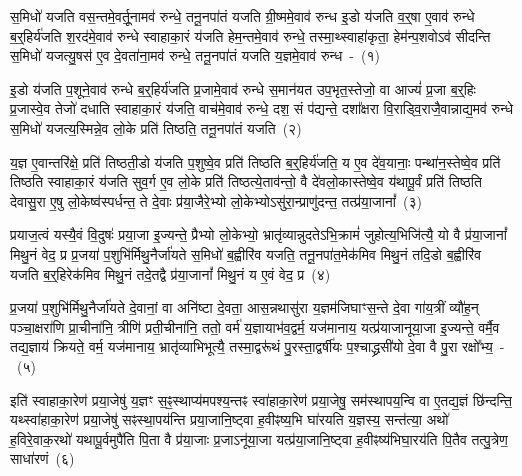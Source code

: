 
\setcounter{anuvakam}{0}
स॒मिधो॑ यजति वस॒न्तमे॒वर्तू॒नामव॑ रुन्धे॒ तनू॒नपा॑तं यजति ग्री॒ष्ममे॒वाव॑ रुन्ध इ॒डो य॑जति व॒र्॒\mbox{}षा ए॒वाव॑ रुन्धे ब॒र्॒\mbox{}हिर्य॑जति श॒रद॑मे॒वाव॑ रुन्धे स्वाहाका॒रं य॑जति हेम॒न्तमे॒वाव॑ रुन्धे॒ तस्मा॒थ्\-स्वाहा॑कृता॒ हेम॑न्प॒शवो\-ऽव॑ सीदन्ति स॒मिधो॑ यजत्यु॒षस॑ ए॒व दे॒वता॑ना॒मव॑ रुन्धे॒ तनू॒नपा॑तं यजति य॒ज्ञमे॒वाव॑ रुन्ध~-~(१)

इ॒डो य॑जति प॒शूने॒वाव॑ रुन्धे ब॒र्॒\mbox{}हिर्य॑जति प्र॒जामे॒वाव॑ रुन्धे स॒मान॑यत उप॒भृत॒स्तेजो॒ वा आज्यं॑ प्र॒जा ब॒र्॒\mbox{}हिः प्र॒जास्वे॒व तेजो॑ दधाति स्वाहाका॒रं य॑जति॒ वाच॑मे॒वाव॑ रुन्धे॒ दश॒ सं प॑द्यन्ते॒ दशा᳚क्षरा वि॒राड्वि॒राजै॒वान्नाद्य॒मव॑ रुन्धे स॒मिधो॑ यजत्य॒स्मिन्ने॒व लो॒के प्रति॑ तिष्ठति॒ तनू॒नपा॑तं यजति~(२)

य॒ज्ञ ए॒वान्तरि॑क्षे॒ प्रति॑ तिष्ठती॒डो य॑जति प॒शुष्वे॒व प्रति॑ तिष्ठति ब॒र्॒\mbox{}हिर्य॑जति॒ य ए॒व दे॑व॒यानाः॒ पन्था॑न॒स्तेष्वे॒व प्रति॑ तिष्ठति स्वाहाका॒रं य॑जति सुव॒र्ग ए॒व लो॒के प्रति॑ तिष्ठत्ये॒ताव॑न्तो॒ वै दे॑व\-लो॒का\-स्तेष्वे॒व य॑थापू॒र्वं प्रति॑ तिष्ठति देवासु॒रा ए॒षु लो॒केष्व॑स्पर्धन्त॒ ते दे॒वाः प्र॑या॒जैरे॒भ्यो लो॒केभ्यो\-ऽसु॑रा॒न्प्राणु॑दन्त॒ तत्प्र॑या॒जानां᳚~(३)

प्रयाज॒त्वं यस्यै॒वं वि॒दुषः॑ प्रया॒जा इ॒ज्यन्ते॒ प्रैभ्यो लो॒केभ्यो॒ भ्रातृ॑व्यान्नुदते\-ऽभि॒क्रामं॑ जुहोत्य॒भिजि॑त्यै॒ यो वै प्र॑या॒जानां᳚ मिथु॒नं वेद॒ प्र प्र॒जया॑ प॒शुभि॑र्मिथु॒नैर्जा॑यते स॒मिधो॑ ब॒ह्वीरि॑व यजति॒ तनू॒नपा॑त॒मेक॑मिव मिथु॒नं तदि॒डो ब॒ह्वीरि॑व यजति ब॒र्॒\mbox{}हिरेक॑मिव मिथु॒नं तदे॒तद्वै प्र॑या॒जानां᳚ मिथु॒नं य ए॒वं वेद॒ प्र~(४)

प्र॒जया॑ प॒शुभि॑र्मिथु॒नैर्जा॑यते दे॒वानां॒ वा अनि॑ष्टा दे॒वता॒ आस॒\-न्नथा\-सु॑रा य॒ज्ञम॑\-जिघाꣳस॒न्ते दे॒वा गा॑य॒त्रीं व्यौ॑ह॒न् पञ्चा॒क्षरा॑णि प्रा॒ची\-ना॑नि॒ त्रीणि॑ प्रती॒चीना॑नि॒ ततो॒ वर्म॑ य॒ज्ञायाभ॑व॒द्वर्म॒ यज॑मानाय॒ यत्प्र॑या\-जा\-नू\-या॒जा इ॒ज्यन्ते॒ वर्मै॒व तद्य॒ज्ञाय॑ क्रियते॒ वर्म॒ यज॑मानाय॒ भ्रातृ॑व्या\-भिभूत्यै॒ तस्मा॒द्वरू॑थं पु॒रस्ता॒द्वर्\mbox{}षी॑यः प॒श्चाद्ध्रसी॑यो दे॒वा वै पु॒रा रक्षो᳚भ्य॒~-~(५)

इति॑ स्वाहा\-का॒रेण॑ प्रया॒जेषु॑ य॒ज्ञꣳ स॒ꣴ॒स्थाप्य॑मपश्य॒न्तꣴ स्वा॑हा\-का॒रेण॑ प्रया॒जेषु॒ सम॑स्थापय॒न्वि वा ए॒तद्य॒ज्ञं छि॑न्दन्ति॒ यथ्\-स्वा॑हा\-का॒रेण॑ प्रया॒जेषु॑ सꣴस्था॒पय॑न्ति प्रया॒जानि॒ष्ट्वा ह॒वीꣴष्य॒भि घा॑रयति य॒ज्ञस्य॒ सन्त॑त्या॒ अथो॑ ह॒विरे॒वाक॒रथो॑ यथापू॒र्वमुपै॑ति पि॒ता वै प्र॑या॒जाः प्र॒जा\-ऽनू॑या॒जा यत्प्र॑या॒जानि॒ष्ट्वा ह॒वीꣴष्य॑भिघा॒रय॑ति पि॒तैव तत्पु॒त्रेण॒ साधा॑रणं~(६)

